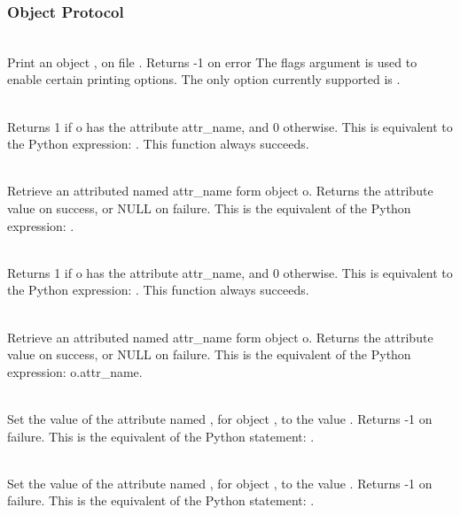 \subsubsection{Object Protocol}
     \\
         Print an object , on file .  Returns -1 on error
	 The flags argument is used to enable certain printing
	 options. The only option currently supported is . 

     \\
         Returns 1 if o has the attribute attr_name, and 0 otherwise.
     This is equivalent to the Python expression:
	 .
	 This function always succeeds.

     \\
	 Retrieve an attributed named attr_name form object o.
	 Returns the attribute value on success, or NULL on failure.
	 This is the equivalent of the Python expression: .


     \\
         Returns 1 if o has the attribute attr_name, and 0 otherwise.
	 This is equivalent to the Python expression:
	 . 
	 This function always succeeds.


     \\
	 Retrieve an attributed named attr_name form object o.
	 Returns the attribute value on success, or NULL on failure.
	 This is the equivalent of the Python expression: o.attr_name.


     \\
	 Set the value of the attribute named , for object ,
	 to the value . Returns -1 on failure.  This is
	 the equivalent of the Python statement: .


     \\
	 Set the value of the attribute named , for object ,
	 to the value . Returns -1 on failure.  This is
	 the equivalent of the Python statement: .


